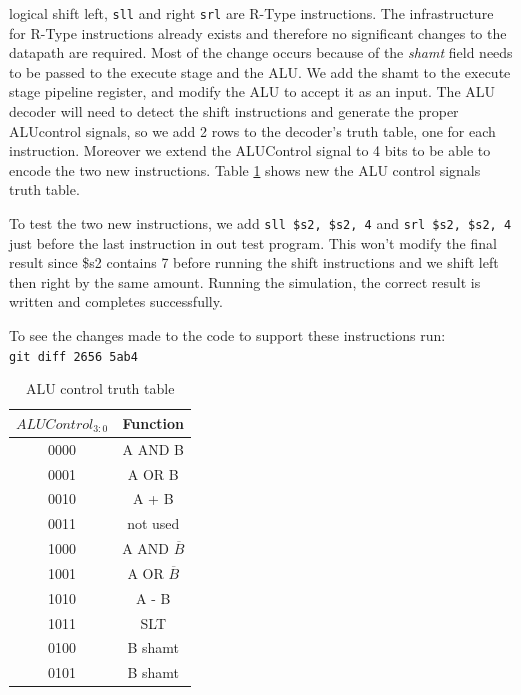 \documentclass[titlepage,12pt,twoside,a4paper]{article}
\newcommand{\code}[1]{{\texttt{#1}}}
\begin{document}
logical shift left, \code{sll} and right \code{srl} are R-Type instructions. The infrastructure for R-Type instructions already exists and therefore no significant changes to the datapath are required. Most of the change occurs because of the \textit{shamt} field needs to be passed to the execute stage and the ALU. We add the shamt to the execute stage pipeline register, and modify the ALU to accept it as an input. The ALU decoder will need to detect the shift instructions and generate the proper ALUcontrol signals, so we add 2 rows to the decoder's truth table, one for each instruction. Moreover we extend the ALUControl signal to 4 bits to be able to encode the two new instructions. Table \ref{table:aluctrl} shows new the ALU control signals truth table.

To test the two new instructions, we add \code{sll \$s2, \$s2, 4} and \code{srl \$s2, \$s2, 4} just before the last instruction in out test program. This won't modify the final result since \$s2 contains 7 before running the shift instructions and we shift left then right by the same amount. Running the simulation, the correct result is written and completes successfully.

To see the changes made to the code to support these instructions run:\\
\code{git diff 2656 5ab4} 
\begin{table}
\begin{center}
	
	\begin{tabular}{|c|c|}
		\hline
		$ALUControl_{3:0}$ & Function \\
		\hline
		0000 & A AND B \\
		0001 & A OR B \\
		0010 & A + B \\
		0011 & not used \\
		1000 & A AND $\overline{B}$ \\
		1001 & A OR $\overline{B}$ \\
		1010 & A - B \\
		1011 & SLT \\
		0100 & B \textlangle{}\textlangle{ }shamt \\
		0101 & B \textrangle{}\textrangle{ }shamt \\
		\hline
	\end{tabular}
\end{center}
	\label{table:aluctrl}
	\caption{ALU control truth table}
\end{table}
\end{document}

